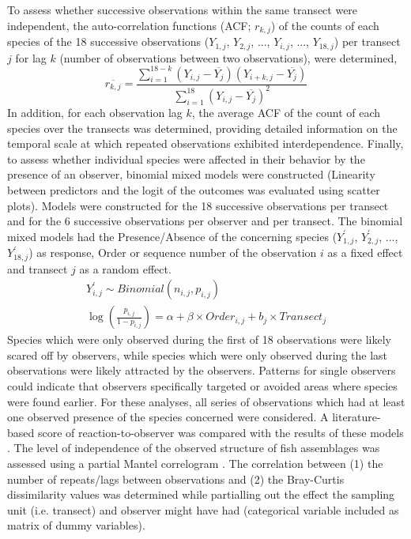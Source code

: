 \documentclass[10pt,letterpaper]{article}
\begin{document}
To assess whether successive observations within the same transect were independent, the auto-correlation functions (ACF; $r_{k,j}$) of the counts of each species of the 18 successive observations ($Y_{1,j}$, $Y_{2,j}$, ..., $Y_{i,j}$, ..., $Y_{18,j}$) per transect $j$ for lag $k$ (number of observations between two observations), were determined,  
\begin{equation}
\label{eq:ACF}
\overline{r_{k,j}}=\frac{\sum_{i=1}^{18-k}(Y_{i,j}-\overline{Y_{j}})(Y_{i+k,j}-\overline{Y_{j}})}{\sum_{i=1}^{18}(Y_{i,j}-\overline{Y_{j}})^{2}} 
\end{equation}
In addition, for each observation lag $k$, the average ACF of the count of each species over the transects was determined, providing detailed information on the temporal scale at which repeated observations exhibited interdependence. Finally, to assess whether individual species were affected in their behavior by the presence of an observer, binomial mixed models were constructed (Linearity between predictors and the logit of the outcomes was evaluated using scatter plots). Models were constructed for the 18 successive observations per transect and for the 6 successive observations per observer and per transect. The binomial mixed models had the Presence/Absence of the concerning species ($Y_{1,j}^{'}$, $Y_{2,j}^{'}$, ..., $Y_{18,j}^{'}$) as response, Order or sequence number of the observation $i$ as a fixed effect and transect $j$ as a random effect. 
\begin{equation}
\label{eq:BinMODEL}
\begin{array}{l}
Y_{i,j}^{'}\sim Binomial(n_{i,j},p_{i,j})\\
\log(\frac{p_{i,j}}{1-p_{i,j}})=\alpha+\beta\times Order_{i,j}+b_{j}\times Transect_{j} 
\end{array}
\end{equation}
Species which were only observed during the first of 18 observations were likely scared off by observers, while species which were only observed during the last observations were likely attracted by the observers. Patterns for single observers could indicate that observers specifically targeted or avoided areas where species were found earlier. For these analyses, all series of observations which had at least one observed presence of the species concerned were considered. A literature-based score of reaction-to-observer was compared with the results of these models \cite{Humann2003ReefGalapagos}. 
The level of independence of the observed structure of fish assemblages was assessed using a partial Mantel correlogram \cite{Legendre2012}. The correlation between (1) the number of repeats/lags between observations and (2) the Bray-Curtis dissimilarity values was determined while partialling out the effect 
the sampling unit (i.e. transect) and observer might have had (categorical variable included as matrix of dummy variables). 
\end{document}

